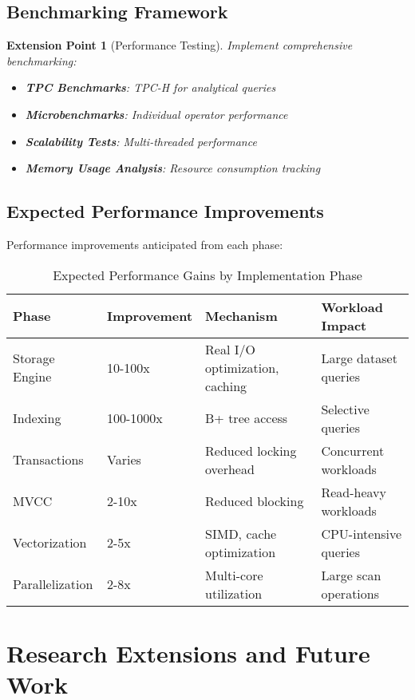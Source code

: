 \documentclass[12pt,a4paper]{article}
\newtheorem{extension}{Extension Point}[section]
\begin{document}
\subsection{Benchmarking Framework}

\begin{extension}[Performance Testing]
Implement comprehensive benchmarking:

\begin{itemize}
    \item \textbf{TPC Benchmarks}: TPC-H for analytical queries
    \item \textbf{Microbenchmarks}: Individual operator performance
    \item \textbf{Scalability Tests}: Multi-threaded performance
    \item \textbf{Memory Usage Analysis}: Resource consumption tracking
\end{itemize}
\end{extension}

\subsection{Expected Performance Improvements}

Performance improvements anticipated from each phase:

\begin{table}[htbp]
\centering
\caption{Expected Performance Gains by Implementation Phase}
\label{tab:performance_gains}
\begin{tabular}{lp{3cm}p{3cm}p{4cm}}
\toprule
\textbf{Phase} & \textbf{Improvement} & \textbf{Mechanism} & \textbf{Workload Impact} \\
\midrule
Storage Engine & 10-100x & Real I/O optimization, caching & Large dataset queries \\
Indexing & 100-1000x & B+ tree access & Selective queries \\
Transactions & Varies & Reduced locking overhead & Concurrent workloads \\
MVCC & 2-10x & Reduced blocking & Read-heavy workloads \\
Vectorization & 2-5x & SIMD, cache optimization & CPU-intensive queries \\
Parallelization & 2-8x & Multi-core utilization & Large scan operations \\
\bottomrule
\end{tabular}
\end{table}

\section{Research Extensions and Future Work}
\end{document}
